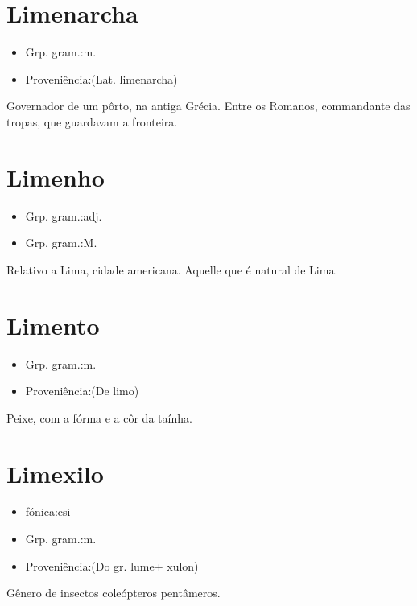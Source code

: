 \section{Limenarcha}
\begin{itemize}
\item {Grp. gram.:m.}
\end{itemize}
\begin{itemize}
\item {Proveniência:(Lat. \textunderscore limenarcha\textunderscore )}
\end{itemize}
Governador de um pôrto, na antiga Grécia.
Entre os Romanos, commandante das tropas, que guardavam a fronteira.
\section{Limenho}
\begin{itemize}
\item {Grp. gram.:adj.}
\end{itemize}
\begin{itemize}
\item {Grp. gram.:M.}
\end{itemize}
Relativo a Lima, cidade americana.
Aquelle que é natural de Lima.
\section{Limento}
\begin{itemize}
\item {Grp. gram.:m.}
\end{itemize}
\begin{itemize}
\item {Proveniência:(De \textunderscore limo\textunderscore )}
\end{itemize}
Peixe, com a fórma e a côr da taínha.
\section{Limexilo}
\begin{itemize}
\item {fónica:csi}
\end{itemize}
\begin{itemize}
\item {Grp. gram.:m.}
\end{itemize}
\begin{itemize}
\item {Proveniência:(Do gr. \textunderscore lume\textunderscore  + \textunderscore xulon\textunderscore )}
\end{itemize}
Gênero de insectos coleópteros pentâmeros.
